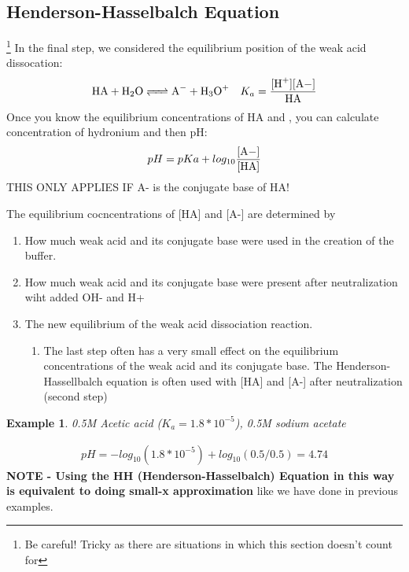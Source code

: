 \documentclass{article}  %
\newtheorem{exmp}{Example}
\begin{document}
\subsection*{Henderson-Hasselbalch Equation}\footnote{Be careful! Tricky as there are situations in which this section doesn't count for}
In the final step, we considered the equilibrium position of the weak acid dissocation:
\begin{equation*}
    \begin{aligned}
        \ce{HA + H2O <=> A- + H3O+} \quad K_a = \ce{\frac{[H+][A-]}{HA}} 
    \end{aligned}
\end{equation*}
Once you know the equilibrium concentrations of HA and , you can calculate concentration of hydronium and then pH:
\begin{equation*}
    \begin{aligned}
        pH = pKa + log_{10}\ce{\frac{[A-]}{[HA]}}
    \end{aligned}
\end{equation*}
THIS ONLY APPLIES IF A- is the conjugate base of HA!

The equilibrium cocncentrations of [HA] and [A-] are determined by 
\begin{enumerate}
    \item How much weak acid and its conjugate base were used in the creation of the buffer.
    \item How much weak acid and its conjugate base were present after neutralization wiht added OH- and H+
    \item The new equilibrium of the weak acid dissociation reaction.
    \begin{enumerate}
        \item The last step often has a very small effect on the equilibrium concentrations of the weak acid and its conjugate base. The Henderson-Hassellbalch equation is often used with [HA] and [A-] after neutralization (second step) 
    \end{enumerate}
\end{enumerate}
\begin{exmp}
    0.5M Acetic acid ($K_a = 1.8*10^{-5}$), 0.5M sodium acetate
\end{exmp}
\begin{equation*}
    \begin{aligned}
        pH = -log_{10}(1.8*10^{-5}) + log_{10}(0.5/0.5) = 4.74
    \end{aligned}
\end{equation*}
\textbf{NOTE - Using the HH (Henderson-Hasselbalch) Equation in this way is equivalent to doing small-x approximation} like we have done in previous examples.
\end{document}
